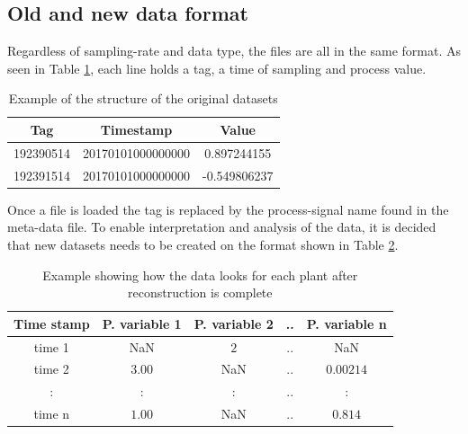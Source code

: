     \subsection{Old and new data format}\label{subsec:data_format}
        Regardless of sampling-rate and data type, the files are all in the same format. As seen in Table \ref{tab:orig_data}, each line holds a tag, a time of sampling and process value. 
        \begin{table}[h]
            \centering
            \begin{tabular}{c c c}
                \toprule
                 \textbf{Tag}        & \textbf{Timestamp}         & \textbf{Value}  \\ \midrule
                 192390514  & 20170101000000000 & 0.897244155 \\
                 192391514  & 20170101000000000 & -0.549806237 \\ \bottomrule
            \end{tabular}
            \caption{Example of the structure of the original datasets}
            \label{tab:orig_data}
        \end{table}
        Once a file is loaded the tag is replaced by the process-signal name found in the meta-data file. To enable interpretation and analysis of the data, it is decided that new datasets needs to be created on the format shown in Table \ref{tab:plant_format}.
        \begin{table}[h]
            \centering
            \begin{tabular}{c c c c c }
                \toprule
                \textbf{Time stamp} & \textbf{P. variable 1}     & \textbf{P. variable 2}    & \textbf{..}    & \textbf{P. variable n}    \\ \midrule
                time 1        & NaN         & $2$           & ..    & NaN         \\ 
                time 2        & $3.00$      & NaN           & ..    & $0.00214$\\ 
                :            & :            & :             & ..    & : \\ 
                time n        & $1.00$      & NaN           & ..    & $0.814$\\ \bottomrule
            \end{tabular}
            \caption{Example showing how the data looks for each plant after reconstruction is complete}
            \label{tab:plant_format}
        \end{table}

